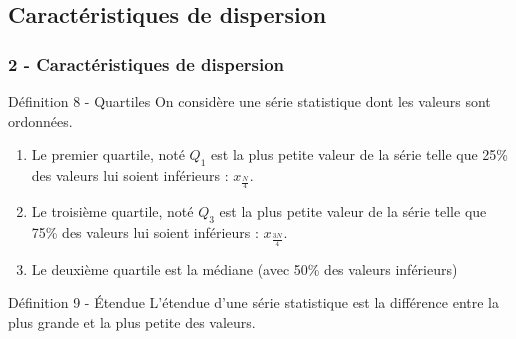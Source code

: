 \documentclass{beamer}
\begin{document}
\subsection{Caractéristiques de dispersion}

\begin{frame}
  \frametitle{2 - Caractéristiques de dispersion }

  \begin{alertblock}{Définition 8 - Quartiles}
    On considère une série statistique dont les valeurs sont ordonnées.

    \begin{enumerate}
    \item Le premier quartile, noté $Q_1$ est la plus petite valeur de la série telle que 25\% des valeurs lui soient inférieurs : $x_\frac{N}{4}$.
    \item Le troisième quartile, noté $Q_3$ est la plus petite valeur de la série telle que 75\% des valeurs lui soient inférieurs : $x_\frac{3N}{4}$.
    \item Le deuxième quartile est la médiane (avec 50\% des valeurs inférieurs)
    \end{enumerate}
  \end{alertblock}

  \begin{alertblock}{Définition 9 - Étendue}
    L'étendue d'une série statistique est la différence entre la plus grande et la plus petite des valeurs.
  \end{alertblock}
\end{frame}
\end{document}
